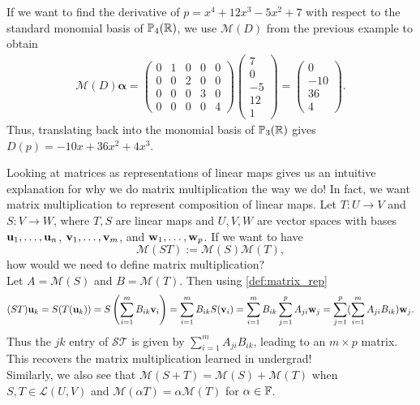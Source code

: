 \documentclass{article}
\begin{document}
\begin{example}
If we want to find the derivative of $p= x^4 +12x^3 -5x^2 +7$ with respect to the standard monomial basis of $\mathbb{P}_4({\mathbb{R}})$, we use $\mathcal{M}(D)$ from the previous example to obtain
\begin{align*}
    \mathcal{M}(D)\boldsymbol{\alpha} = \begin{pmatrix}
    0 & 1 & 0 & 0 & 0 \\
    0 & 0 & 2 & 0 & 0 \\
    0 & 0 & 0 & 3 & 0 \\
    0 & 0 & 0 & 0 & 4
     \end{pmatrix} \begin{pmatrix} 7\\ 0\\ -5\\12\\1
     \end{pmatrix} = \begin{pmatrix} 0 \\ -10\\ 36\\4
     \end{pmatrix}.
\end{align*}
Thus, translating back into the monomial basis of $\mathbb{P}_3({\mathbb{R}})$ gives $D(p) = -10x + 36x^2 +4x^3$.
\end{example}

Looking at matrices as representations of linear maps gives us an intuitive explanation for why we do matrix multiplication the way we do! In fact, we want matrix multiplication to represent composition of linear maps. 
Let $T: U \to V$ and $S:V \to W$, where $T, S$ are linear maps and $U,V,W$ are vector spaces with bases ${\mathbf{u}}_1, \ldots, {\mathbf{u}}_n$, ${\mathbf{v}}_1, \ldots, {\mathbf{v}}_m$, and ${\mathbf{w}}_1, \ldots, {\mathbf{w}}_p$. If we want to have 
\begin{equation*}
    \mathcal{M}(ST) := \mathcal{M}(S) \mathcal{M}(T),
\end{equation*}
how would we need to define matrix multiplication? \\
Let $A = \mathcal{M}(S)$ and $B = \mathcal{M}(T)$. Then using \cref{def:matrix_rep}
\begin{align*}
    (ST){\mathbf{u}}_k = S(T({\mathbf{u}}_k)) = S\left(\sum_{i=1}^m B_{ik}{\mathbf{v}}_i\right) = \sum_{i=1}^m B_{ik} S({\mathbf{v}}_i)= \sum_{i=1}^m B_{ik} \sum_{j=1}^p A_{ji} {\mathbf{w}}_j =\sum_{j=1}^p (\sum_{i=1}^m A_{ji} B_{ik}) {\mathbf{w}}_j.
\end{align*}
Thus the $jk$ entry of $\mathcal{ST}$ is given by $\sum_{i=1}^m A_{ji} B_{ik}$, leading to an $m\times p$ matrix. This recovers the matrix multiplication learned in undergrad!\\
Similarly, we also see that $\mathcal{M}(S+T) = \mathcal{M}(S) + \mathcal{M}(T)$ when $S,T \in \mathcal{L}(U,V)$ and $\mathcal{M}(\alpha T) = \alpha \mathcal{M}(T)$ for $\alpha \in {\mathbb{F}}$.
\end{document}
